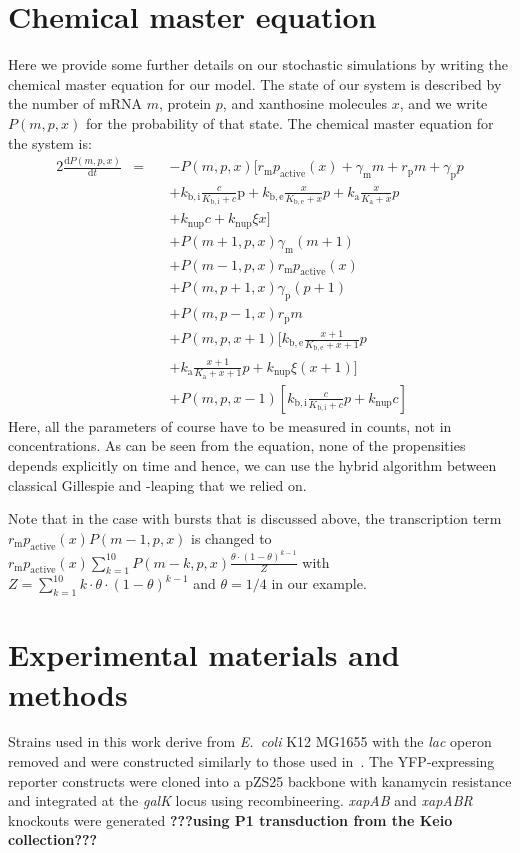 \documentclass[10pt,letterpaper]{article}
\newcommand{\n}[1]{\mathrm{#1}}
\newcommand{\dd}[2]{\frac{\mathrm{d} #1}{\mathrm{d} #2}}
\begin{document}
\section{Chemical master equation}
Here we provide some further details on our stochastic simulations by writing the chemical master equation for our model. The state of our system is described by the number of mRNA $m$, protein $p$, and xanthosine molecules $x$, and we write $P(m,p,x)$ for the probability of that state. The chemical master equation for the system is:
\begin{alignat}{2}
\dd{P(m,p,x)}{t} &= \ && - P(m,p,x) [ r_{\n{m}} p_{\n{active}}(x) + \gamma_{\n{m}} m + r_{\n{p}} m + \gamma_{\n{p}} p \nonumber \\ & && + k_{\n{b,i}} \frac{c}{K_{\n{b,i}} + c} \n{p} + k_{\n{b,e}} \frac{x}{K_{\n{b,e}} + x} p + k_{\n{a}} \frac{x}{K_{\n{a}} + x} p \nonumber \\ & && + k_{\n{nup}} c + k_{\n{nup}} \xi x ] \nonumber \\ & && 
+ P(m+1,p,x) \gamma_{\n{m}} (m + 1) \nonumber \\ & &&  + P(m-1,p,x) r_{\n{m}} p_{\n{active}}(x) \nonumber \\ & && 
+ P(m,p+1,x) \gamma_{\n{p}} (p + 1) \nonumber \\ & &&  + P(m,p-1,x) r_{\n{p}} m \nonumber \\ & && 
+ P(m,p,x+1) [ k_{\n{b,e}} \frac{x+1}{K_{\n{b,e}} + x+1} p \nonumber \\ & && + k_{\n{a}} \frac{x+1}{K_{\n{a}} + x+1} p + k_{\n{nup}} \xi (x+1) ] \nonumber \\ & &&
+ P(m,p,x-1) [ k_{\n{b,i}} \frac{c}{K_{\n{b,i}} + c} p + k_{\n{nup}} c ]  
\end{alignat}
Here, all the parameters of course have to be measured in counts, not in concentrations. As can be seen from the equation, none of the propensities depends explicitly on time and hence, we can use the hybrid algorithm between classical Gillespie and \texttau-leaping that we relied on.


Note that in the case with bursts that is discussed above, the transcription term $r_{\n{m}} p_{\n{active}}(x) P(m-1,p,x)$ is changed to $r_{\n{m}} p_{\n{active}}(x) \sum_{k=1}^{10} P(m-k,p,x) \frac{\theta\cdot (1-\theta)^{k-1}}{Z}$ with $Z = \sum_{k=1}^{10} k \cdot \theta\cdot (1-\theta)^{k-1}$ and $\theta = 1/4$ in our example.

\FloatBarrier
\newpage

\section{Experimental materials and methods} \label{sec:exp}
Strains used in this work derive from \emph{E.\ coli} K12 MG1655 with
the \emph{lac} operon removed and were constructed similarly to those
used in~\cite{RazoMejia2018}. The YFP-expressing reporter constructs
were cloned into a pZS25 backbone with kanamycin resistance and
integrated at the \emph{galK} locus using recombineering.
\textDelta\emph{xapAB} and \textDelta\emph{xapABR} knockouts were
generated \textbf{???using P1 transduction from the Keio collection???}
\end{document}
